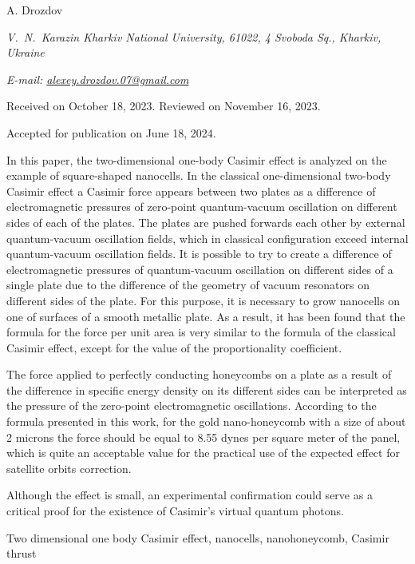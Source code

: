 \documentclass[twoside, 10pt]{article}
\makeatletter
\def\myname{A. Drozdov}
\def\myemail{alexey.drozdov.07@gmail.com}
\def\myworkplace{V.~N.~Karazin Kharkiv National University, 61022, 4 Svoboda Sq., Kharkiv, Ukraine}
\def\myorcidlink{0009-0004-1386-4534}
\def\myreceived{Received on October 18, 2023. Reviewed on November 16, 2023.}
\def\myaccepted{Accepted for publication on June 18, 2024.}
\makeatother
\begin{document}
\centerline{\Large{\myname \,\orcidlink{\myorcidlink} }}
\vspace{3mm}
\centerline{\textit{\myworkplace}}
\centerline{\textit{E-mail: \href{mailto:\myemail}{\myemail}}}

\vspace{3mm}
\centerline{\myreceived}
\centerline{\myaccepted}

\vspace{3.5mm}

In this paper, the two-dimensional one-body Casimir effect is analyzed
on the example of square-shaped nanocells.
In the classical one-dimensional two-body Casimir effect a Casimir force
appears between two plates as a difference of electromagnetic pressures
of zero-point quantum-vacuum oscillation on different sides of each of the plates.
The plates are pushed forwards each other by external quantum-vacuum oscillation fields,
which in classical configuration exceed internal quantum-vacuum oscillation fields.
It is possible to try to create a difference of electromagnetic pressures
of quantum-vacuum oscillation on different sides of a single plate
due to the difference of the geometry of vacuum resonators on different sides of the plate.
For this purpose, it is necessary to grow nanocells on one of surfaces of a smooth metallic plate.
As a result, it has been found that the formula for the force per unit area is very similar to the formula of the classical Casimir effect,
except for the value of the proportionality coefficient.

The force applied to perfectly conducting honeycombs on a plate as a result of the
difference in specific energy density on its different sides can be interpreted
as the pressure of the zero-point electromagnetic oscillations.
According to the formula presented in this work, for the gold nano-honeycomb
with a size of about 2 microns the force should be equal to 8.55 dynes per square meter of the panel, which is quite
an acceptable value for the practical use of the expected effect for satellite orbits correction.

    Although the effect is small, an experimental confirmation
could serve as a critical proof for the existence of Casimir's virtual quantum photons.



\begin{keywords}
Two dimensional one body Casimir effect, nanocells, nanohoneycomb, Casimir thrust
\end{keywords}
\end{document}
